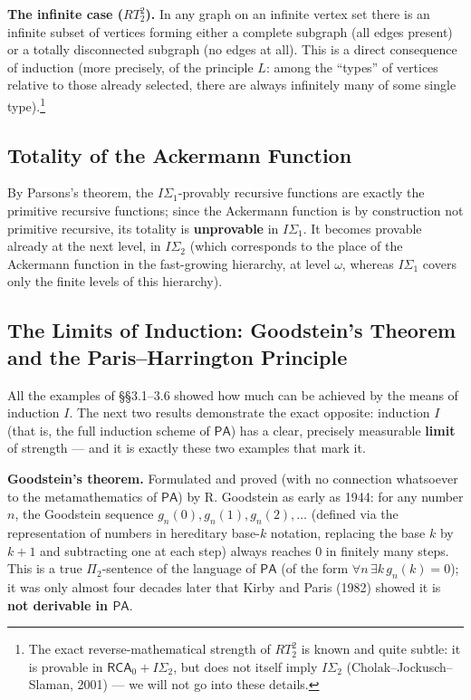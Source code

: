 \documentclass[12pt,a4paper]{article}
\theoremstyle{plain}
\theoremstyle{definition}
\newcommand{\PA}{\textsf{PA}}
\begin{document}
\textbf{The infinite case ($RT^2_2$).} In any graph on an infinite vertex set there is an infinite subset of vertices forming either a complete subgraph (all edges present) or a totally disconnected subgraph (no edges at all). This is a direct consequence of induction (more precisely, of the principle $L$: among the ``types'' of vertices relative to those already selected, there are always infinitely many of some single type).\footnote{The exact reverse-mathematical strength of $RT^2_2$ is known and quite subtle: it is provable in $\textsf{RCA}_0+I\Sigma_2$, but does not itself imply $I\Sigma_2$ (Cholak--Jockusch--Slaman, 2001) --- we will not go into these details.}

\subsection{Totality of the Ackermann Function}
By Parsons's theorem, the $I\Sigma_1$-provably recursive functions are exactly the primitive recursive functions; since the Ackermann function is by construction not primitive recursive, its totality is \textbf{unprovable} in $I\Sigma_1$. It becomes provable already at the next level, in $I\Sigma_2$ (which corresponds to the place of the Ackermann function in the fast-growing hierarchy, at level $\omega$, whereas $I\Sigma_1$ covers only the finite levels of this hierarchy).

\subsection{The Limits of Induction: Goodstein's Theorem and the Paris--Harrington Principle}
All the examples of §§3.1--3.6 showed how much can be achieved by the means of induction $I$. The next two results demonstrate the exact opposite: induction $I$ (that is, the full induction scheme of $\PA$) has a clear, precisely measurable \textbf{limit} of strength --- and it is exactly these two examples that mark it.

\textbf{Goodstein's theorem.} Formulated and proved (with no connection whatsoever to the metamathematics of $\PA$) by R. Goodstein as early as 1944: for any number $n$, the Goodstein sequence $g_n(0), g_n(1), g_n(2),\ldots$ (defined via the representation of numbers in hereditary base-$k$ notation, replacing the base $k$ by $k+1$ and subtracting one at each step) always reaches $0$ in finitely many steps. This is a true $\Pi_2$-sentence of the language of $\PA$ (of the form $\forall n\,\exists k\,g_n(k)=0$); it was only almost four decades later that Kirby and Paris (1982) showed it is \textbf{not derivable in $\PA$}.
\end{document}
